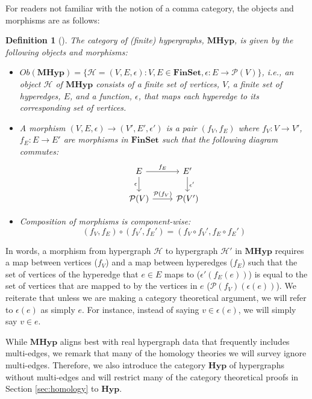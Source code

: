 \documentclass{amsart}
\newtheorem{definition}[theorem]{Definition}
\newcommand{\FinSet}{\mathrm{\textbf{FinSet}}}
\newcommand{\Hyp}{\mathrm{\textbf{Hyp}}}
\newcommand{\MHyp}{\mathrm{\textbf{MHyp}}}
\renewcommand{\H}{\mathcal{H}}
\newcommand{\po}{\mathcal{P}}
\begin{document}
For readers not familiar with the notion of a comma category, the objects and morphisms are as follows:
\begin{definition}[{\cite[page 6]{grilliette2023incidence}}]
    The category of (finite) hypergraphs, $\MHyp$, is given by the following objects and morphisms:
    \begin{itemize}
        \item $Ob(\MHyp) = \{ \H = (V, E, \epsilon) : V, E \in \FinSet, \epsilon : E \rightarrow \po(V)\}$, i.e., an object $\H$ of $\MHyp$ consists of a finite set of vertices, $V$, a finite set of hyperedges, $E$, and a function, $\epsilon$, that maps each hyperedge to its corresponding set of vertices.
        \item A morphism $(V, E, \epsilon) \rightarrow (V', E', \epsilon')$ is a pair $(f_V, f_E)$ where $f_V : V\rightarrow V'$, $f_E : E\rightarrow E'$ are morphisms in $\FinSet$ such that the following diagram commutes:
            \[ \begin{tikzcd}
            E \arrow{r}{f_E} \arrow[swap]{d}{\epsilon} & E' \arrow{d}{\epsilon'} \\%
            \po(V) \arrow{r}{\po(f_V)}& \po(V')
            \end{tikzcd}
            \]
        \item Composition of morphisms is component-wise: \[(f_V, f_E) \circ (f_V', f_E') = (f_V\circ f_V', f_E\circ f_E')\]
    \end{itemize}
\end{definition}
In words, a morphism from hypergraph $\H$ to hypergraph $\H'$ in $\MHyp$ requires a map between vertices ($f_V$) and a map between hyperedges ($f_E$) such that the set of vertices of the hyperedge that $e\in E$ maps to ($\epsilon'(f_E(e))$) is equal to the set of vertices that are mapped to by the vertices in $e$ ($\po(f_V)(\epsilon(e))$).
We reiterate that unless we are making a category theoretical argument, we will refer to $\epsilon(e)$ as simply $e$. For instance, instead of saying $v \in \epsilon(e)$, we will simply say $v \in e$.

While $\MHyp$ aligns best with real hypergraph data that frequently includes multi-edges, we remark that many of the homology theories we will survey ignore multi-edges.
Therefore, we also introduce the category $\Hyp$ of hypergraphs without multi-edges and will restrict many of the category theoretical proofs in Section \ref{sec:homology} to $\Hyp$.
\end{document}
